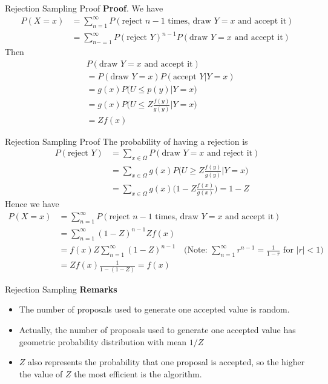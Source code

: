 \documentclass[8pt]{beamer}
\begin{document}
\begin{frame}{Rejection Sampling Proof}
\textbf{Proof}.
We have
\begin{align*}
P(X = x) &= \sum_{n=1}^{\infty} P(\text{reject $n-1$ times, draw $Y = x$ and accept it})\\
&= \sum_{n-=1}^{\infty}P(\text{reject $Y$})^{n-1}P(\text{draw $Y = x$ and accept it})
\end{align*}
Then
\begin{align*}
& P(\text{draw $Y = x$ and accept it})\\
&= P(\text{draw $Y = x$})P(\text{accept $Y|Y=x$})\\
&= g(x)P\biggl(U \leq p(y)| Y = x \biggl) \\
&= g(x)P\biggl(U \leq Z\frac{f(y)}{g(y)} \biggl| Y = x \biggl)\\
&= Zf(x)
\end{align*}
\end{frame}

\begin{frame}{Rejection Sampling Proof}
The probability of having a rejection is 
\begin{align*}
P(\text{reject $Y$}) 
&= \sum_{x\in\Omega} P(\text{draw $Y = x$ and reject it}) \\
&= \sum_{x\in\Omega} g(x)P\biggl(U \geq Z\frac{f(y)}{g(y)} \biggl| Y = x \biggl)\\
&= \sum_{x\in\Omega} g(x) \biggl(1 - Z\frac{f(x)}{g(x)} \biggl) = 1- Z
\end{align*}
Hence we have 
\begin{align*}
P(X = x) 
&= \sum_{n=1}^{\infty} P(\text{reject $n-1$ times, draw $Y = x$ and accept it})\\
&= \sum_{n=1}^{\infty}(1-Z)^{n-1}Zf(x)\\
&= f(x)Z \sum_{n=1}^{\infty}(1-Z)^{n-1} \quad \biggl(\text{Note: $\sum_{n=1}^{\infty}r^{n-1} = \frac{1}{1-r}$ for $|r| < 1$}\biggl)\\
&= Zf(x)\frac{1}{1-(1-Z)} = f(x)
\end{align*}
\end{frame}

\begin{frame}{Rejection Sampling}
\textbf{Remarks}
\begin{itemize}
	\item The number of proposals used to generate one accepted value is random.
	\item Actually, the number of proposals used to generate one accepted value has geometric probability distribution with mean $1/Z$
	\item $Z$ also represents the probability that one proposal is accepted, so the higher the value of $Z$ the most efficient is the algorithm.
\end{itemize}
\end{frame}
\end{document}
